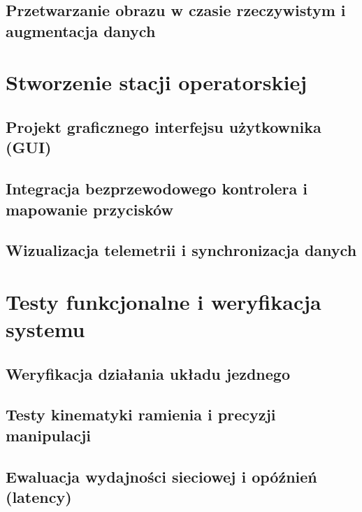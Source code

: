 \documentclass[11pt]{extreport}
\begin{document}
\section{Przetwarzanie obrazu w czasie rzeczywistym i augmentacja danych}


\chapter{Stworzenie stacji operatorskiej}
\section{Projekt graficznego interfejsu użytkownika (GUI)}
\section{Integracja bezprzewodowego kontrolera i mapowanie przycisków}
\section{Wizualizacja telemetrii i synchronizacja danych} %

\chapter{Testy funkcjonalne i weryfikacja systemu}
\section{Weryfikacja działania układu jezdnego}
\section{Testy kinematyki ramienia i precyzji manipulacji}
\section{Ewaluacja wydajności sieciowej i opóźnień (latency)} %
\end{document}

